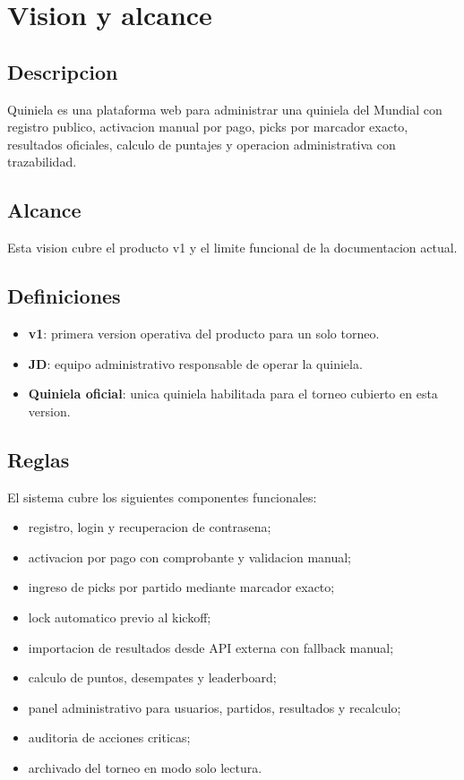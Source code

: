 \section{Vision y alcance}

\subsection{Descripcion}

Quiniela es una plataforma web para administrar una quiniela del Mundial con registro publico, activacion manual por pago, picks por marcador exacto, resultados oficiales, calculo de puntajes y operacion administrativa con trazabilidad.

\subsection{Alcance}

Esta vision cubre el producto v1 y el limite funcional de la documentacion actual.

\subsection{Definiciones}

\begin{itemize}
  \item \textbf{v1}: primera version operativa del producto para un solo torneo.
  \item \textbf{JD}: equipo administrativo responsable de operar la quiniela.
  \item \textbf{Quiniela oficial}: unica quiniela habilitada para el torneo cubierto en esta version.
\end{itemize}

\subsection{Reglas}

El sistema cubre los siguientes componentes funcionales:

\begin{itemize}
  \item registro, login y recuperacion de contrasena;
  \item activacion por pago con comprobante y validacion manual;
  \item ingreso de picks por partido mediante marcador exacto;
  \item lock automatico previo al kickoff;
  \item importacion de resultados desde API externa con fallback manual;
  \item calculo de puntos, desempates y leaderboard;
  \item panel administrativo para usuarios, partidos, resultados y recalculo;
  \item auditoria de acciones criticas;
  \item archivado del torneo en modo solo lectura.
\end{itemize}

